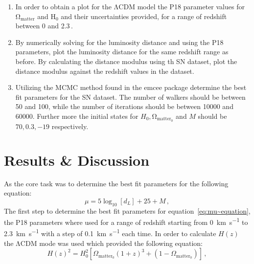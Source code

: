 \documentclass[12pt, a4paper]{article}
\begin{document}
        \begin{enumerate}
            \item In order to obtain a plot for the \(\mathrm{\Lambda}\)CDM model the P18 parameter values for \(\mathrm{\Omega}_{\mathrm{matter}}\) and H\(_0\) and their uncertainties provided, for a range of redshift between 0 and 2.3\,.
            \item By numerically solving for the luminosity distance and using the P18 parameters, plot the luminosity distance for the same redshift range as before. By calculating the distance modulus using th SN dataset, plot the distance modulus against the redshift values in the dataset.
            \item Utilizing the MCMC method found in the emcee package determine the best fit parameters for the SN dataset. The number of walkers should be between 50 and 100, while the number of iterations should be between 10000 and 60000. Further more the initial states for \(H_0, \mathrm{\Omega}_{\mathrm{matter_0}}\) and \(M\) should be \(70, 0.3, -19\) respectively.
        \end{enumerate}

\section{Results \& Discussion}

As the core task was to determine the best fit parameters for the following equation:
\begin{equation}
    \mu = 5\log_{10}[d_L]+25+M\,,
    \label{eq:mu~equation}
\end{equation}
The first step to determine the best fit parameters for equation~\ref{eq:mu~equation}, the P18 parameters where used for a range of redshift starting from \qty{0}{km.s^{-1}} to \qty{2.3}{km.s^{-1}} with a step of \qty{0.1}{km.s^{-1}} each time. In order to calculate \(H(z)\) the \(\mathrm{\Lambda}\)CDM mode was used which provided the following equation:
\begin{equation}
    H(z)^2 = H_0^2[\Omega_{\mathrm{matter_0}}(1+z)^3+(1-\Omega_{\mathrm{matter_0}})]\,,
    \label{eq:Hz~equation}
\end{equation}
\end{document}
